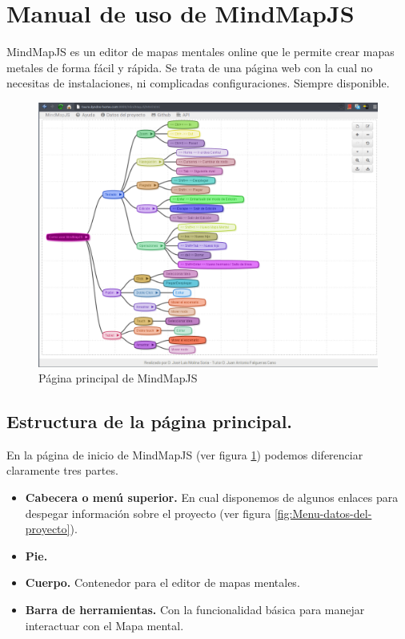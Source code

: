 \newpage
\section{Manual de uso de MindMapJS}

MindMapJS es un editor de mapas mentales online que le permite crear mapas metales de forma fácil y rápida. Se trata de una página web con la cual no necesitas de instalaciones, ni complicadas configuraciones. Siempre disponible. 

\begin{figure}[tbph]
\centering
\includegraphics[width=\linewidth]{imagenes/MindMapJS1}
\caption{Página principal de MindMapJS}
\label{fig:MindMapJS}
\end{figure}


\subsection{Estructura de la página principal.}

En la página de inicio de MindMapJS (ver figura \ref{fig:MindMapJS}) podemos diferenciar claramente tres partes. 

\begin{itemize}
\item \textbf{Cabecera o menú superior.} En cual disponemos de algunos enlaces para despegar información sobre el proyecto (ver figura \ref{fig:Menu-datos-del-proyecto}).
\item \textbf{Pie.}
\item \textbf{Cuerpo.} Contenedor para el editor de mapas mentales.
\item \textbf{Barra de herramientas.} Con la funcionalidad básica para manejar interactuar con el Mapa mental.
\end{itemize}

